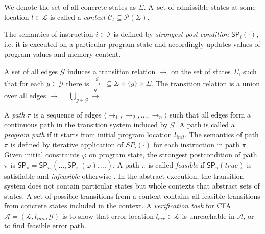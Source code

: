 \noindent
We denote the set of all concrete states as $\Sigma$.  A~set of admissible
states at some location $l \in \mathcal{L}$ is called a \emph{context}
$\mathcal{C}_l \subseteq \mathcal{P}(\Sigma)$.

The semantics of instruction $i \in \mathcal{I}$ is defined by \emph{strongest
post condition} $\textsf{SP}_{i}(\cdot)$, i.e. it is executed on a particular program
state and accordingly updates values of program values and memory content.

A set of all edges $\mathcal{G}$ induces a transition relation $\rightarrow$ on
the set of states $\Sigma$, such that for each $g \in \mathcal{G}$ there is
$\xrightarrow{g} \: \subseteq \Sigma \times \{g\} \times \Sigma$. The
transition relation is a union over all edges $\rightarrow = \bigcup_{g
\in\mathcal{G}} \xrightarrow{g}$.

A \emph{path} $\pi$ is a sequence of edges $\langle
\rightarrow_1, \rightarrow_2, \dots, \rightarrow_n \rangle$ such that all edges
form a continuous path in the transition system induced by $\mathcal{G}$.  A path
is called a \emph{program path} if it starts from initial program location
$l_{\textit{init}}$. The semantics of path $\pi$ is defined by iterative
application of $SP_{i}( \cdot )$ for each instruction in path $\pi$. Given
initial constraints $\varphi$ on program state, the strongest postcondition of
path $\pi$ is $\textsf{SP}_{\pi} =
\textsf{SP}_{i_n}(\dots,\textsf{SP}_{i_1}(\varphi),\dots)$. A path $\pi$ is
called \emph{feasible} if $\textsf{SP}_{\pi}(\textit{true})$ is satisfiable and
\emph{infeasible} otherwise \cite{Beyer2018b}.  In the abstract execution, the
transition system does not contain particular states but whole contexts that
abstract sets of states. A set of possible transitions from a context contains
all feasible transitions from concrete states included in the context.
A \emph{verification task} for  CFA $\mathcal{A} = (\mathcal{L},
l_{\textit{init}}, \mathcal{G})$ is to show that error location
$l_{\textit{err}} \in \mathcal{L}$ is unreachable in $\mathcal{A}$, or to find
feasible error path.

